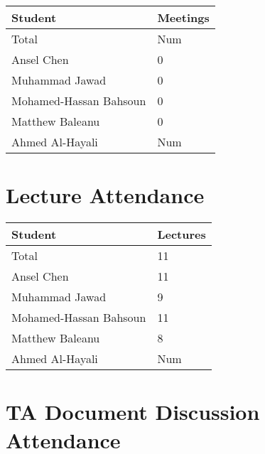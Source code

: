 \documentclass{article}
\begin{document}
\begin{table}[H]
\centering
\begin{tabular}{ll}
\toprule
\textbf{Student} & \textbf{Meetings}\\
\midrule
Total & Num\\
Ansel Chen & 0\\
Muhammad Jawad & 0\\
Mohamed-Hassan Bahsoun & 0\\
Matthew Baleanu & 0\\
Ahmed Al-Hayali & Num\\
\bottomrule
\end{tabular}
\end{table}


\section{Lecture Attendance}


\begin{table}[H]
\centering
\begin{tabular}{ll}
\toprule
\textbf{Student} & \textbf{Lectures}\\
\midrule
Total & 11\\
Ansel Chen & 11\\
Muhammad Jawad & 9\\
Mohamed-Hassan Bahsoun & 11\\
Matthew Baleanu & 8\\
Ahmed Al-Hayali & Num\\
\bottomrule
\end{tabular}
\end{table}


\section{TA Document Discussion Attendance}

\end{document}
